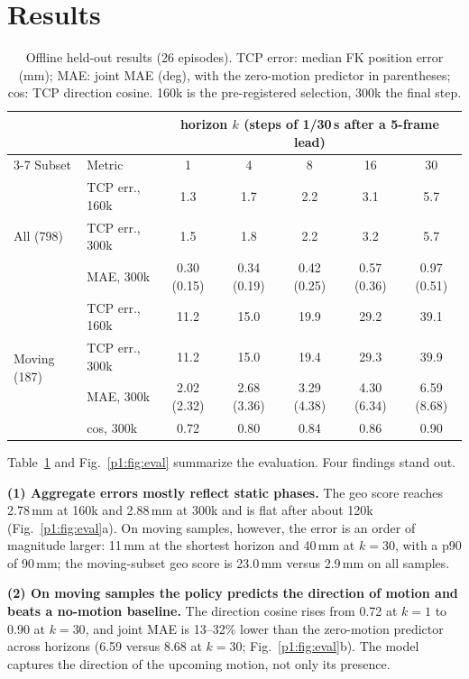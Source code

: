 \documentclass[conference,10pt]{IEEEtran}
\newcommand{\mm}{\,mm\xspace}
\begin{document}
\section{Results}\label{p1:sec:results}
\begin{table}[t]
\centering\footnotesize
\setlength{\tabcolsep}{7pt}
\caption{Offline held-out results (26 episodes). TCP error: median FK position error (mm); MAE: joint MAE (deg), with the
zero-motion predictor in parentheses; cos: TCP direction cosine. 160k is the pre-registered selection, 300k the final step.}
\label{p1:tab:results}
\begin{tabular}{@{}llccccc@{}}
\toprule
 & & \multicolumn{5}{c}{horizon $k$ (steps of 1/30\,s after a 5-frame lead)} \\
\cmidrule(l){3-7}
Subset & Metric & 1 & 4 & 8 & 16 & 30 \\
\midrule
\multirow{3}{*}{All (798)} & TCP err., 160k & 1.3 & 1.7 & 2.2 & 3.1 & 5.7 \\
 & TCP err., 300k & 1.5 & 1.8 & 2.2 & 3.2 & 5.7 \\
 & MAE, 300k & 0.30 (0.15) & 0.34 (0.19) & 0.42 (0.25) & 0.57 (0.36) & 0.97 (0.51) \\
\midrule
\multirow{4}{*}{Moving (187)} & TCP err., 160k & 11.2 & 15.0 & 19.9 & 29.2 & 39.1 \\
 & TCP err., 300k & 11.2 & 15.0 & 19.4 & 29.3 & 39.9 \\
 & MAE, 300k & 2.02 (2.32) & 2.68 (3.36) & 3.29 (4.38) & 4.30 (6.34) & 6.59 (8.68) \\
 & cos, 300k & 0.72 & 0.80 & 0.84 & 0.86 & 0.90 \\
\bottomrule
\end{tabular}
\end{table}

Table~\ref{p1:tab:results} and Fig.~\ref{p1:fig:eval} summarize the evaluation. Four findings stand out.

\textbf{(1) Aggregate errors mostly reflect static phases.} The geo score reaches 2.78\mm at 160k and 2.88\mm at 300k and is
flat after about 120k (Fig.~\ref{p1:fig:eval}a). On moving samples, however, the error is an order of magnitude larger: 11\mm at the
shortest horizon and 40\mm at $k{=}30$, with a p90 of 90\mm; the moving-subset geo score is 23.0\mm versus 2.9\mm on all
samples.

\textbf{(2) On moving samples the policy predicts the direction of motion and beats a no-motion baseline.} The direction
cosine rises from 0.72 at $k{=}1$ to 0.90 at $k{=}30$, and joint MAE is 13--32\% lower than the zero-motion predictor across
horizons (6.59 versus 8.68\textdegree{} at $k{=}30$; Fig.~\ref{p1:fig:eval}b). The model captures the direction of the upcoming motion, not only its presence.
\end{document}
